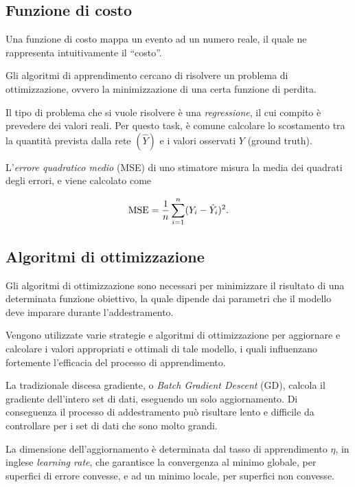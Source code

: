 \subsection{Funzione di costo}
\label{subsec:loss}

Una funzione di costo mappa un evento ad un numero reale, il quale ne rappresenta intuitivamente il ``costo''.

Gli algoritmi di apprendimento cercano di risolvere un problema di ottimizzazione, ovvero la minimizzazione di una certa funzione di perdita. 

Il tipo di problema che si vuole risolvere è una \emph{regressione}, il cui compito è prevedere dei valori reali. Per questo task, è comune calcolare lo scostamento tra la quantità prevista dalla rete $(\hat{Y})$ e i valori osservati $Y$ (ground truth). 
 
L'\emph{errore quadratico medio} (MSE) di uno stimatore misura la media dei quadrati degli errori, e viene calcolato come

\begin{equation}
\operatorname{MSE} = \frac{1}{n}\sum_{i=1}^{n}(Y_i-\hat{Y}_i)^2 \mbox{.}
\end{equation}

\subsection{Algoritmi di ottimizzazione}
\label{subsec:optimizer}

Gli algoritmi di ottimizzazione sono necessari per minimizzare il risultato di una determinata funzione obiettivo, la quale dipende dai parametri che il modello deve imparare durante l'addestramento. 

Vengono utilizzate varie strategie e algoritmi di ottimizzazione per aggiornare e calcolare i valori appropriati e ottimali di tale modello, i quali influenzano fortemente l'efficacia del processo di apprendimento.

La tradizionale discesa gradiente, o \emph{Batch Gradient Descent} (GD), calcola il gradiente dell'intero set di dati, eseguendo un solo aggiornamento. Di conseguenza il processo di addestramento può risultare lento e difficile da controllare per i set di dati che sono molto grandi. 

La dimensione dell'aggiornamento è determinata dal tasso di apprendimento $\eta$, in inglese \emph{learning rate}, che garantisce la convergenza al minimo globale, per superfici di errore convesse, e ad un minimo locale, per superfici non convesse. 


